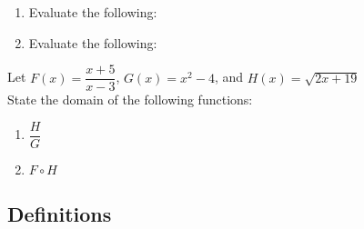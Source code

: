 \begin{myPractice}
\begin{enumerate}
\item Evaluate the following:
	\begin{enumerate}[label=\roman*)]
		\vfill
	\end{enumerate}
\item Evaluate the following:
	\begin{enumerate}[label=\roman*)]
	\begin{multicols}{2}
		\item $(k\circ g)(5)$
		\item $(f\circ h)(8)$
	\end{multicols}
		\vfill
	\end{enumerate}
\end{enumerate}
\end{myPractice}

\newpage



\begin{myPractice}
\item Let $F(x)=\dfrac{x+5}{x-3}$, $G(x)=x^2-4$, and $H(x)=\sqrt{2x+19}$\\

 State the domain of the following functions:
	\begin{enumerate}
		\item $\dfrac{H}{G}$
		\vfill
		\item $F \circ H$
		\vfill
	\end{enumerate}
\end{myPractice}

\newpage

\subsection*{Definitions} \label{def-functions-algebra-and-composition}

